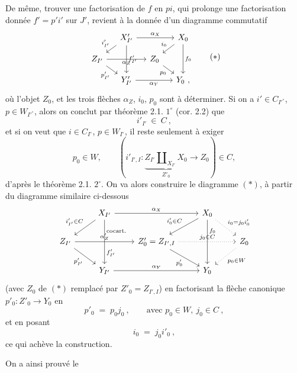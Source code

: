 \documentclass[11pt]{article}
\newcommand{\printedpage}[1]{\marginpar{\footnotesize p.~#1\ifstrequal{#1}{1}{\\[2pt]{[page 1]}}{}}}
\newcommand{\msp}[1]{\ifstrequal{#1}{page 1}{}{\marginpar{\footnotesize [#1]}}}
\begin{document}
De même, trouver une factorisation de $f$ en $pi$, qui prolonge une factorisation donnée $f'=p'i'$ sur $J'$, revient à la donnée d'un diagramme commutatif
\[
\begin{tikzcd}[column sep=small, row sep=small]
& X'_{I'} \arrow[rr, "\alpha_X"] \arrow[dl, "i'_{I'}"'] \arrow[dd, "f'_{I'}"] & & X_0 \arrow[dl, "i_0"'] \arrow[dd, "f_0"] \\
Z_{I'} \arrow[rr, "\alpha_Z"'] \arrow[dr, "p'_{I'}"'] & & Z_0 \arrow[dr, "p_0"'] & \\
& Y'_{I'} \arrow[rr, "\alpha_Y"'] & & Y_0\ ,
\end{tikzcd}
\tag*{$(*)$}
\]
\msp{48: blank}
\msp{49}
où l'objet $Z_0$, et les trois flèches $\alpha_Z$, $i_0$, $p_0$ sont à déterminer. Si on a $i'\in C_{I'^\circ}$, $p\in W_{I'^\circ}$, %
alors on conclut par théorème 2.1. $1^\circ$ (cor. 2.2) que
\[
i'_{I'}\ \in\ C\ ,
\]
et si on veut que $i\in C_{I^\circ}$, $p\in W_{I^\circ}$, il reste seulement à exiger
\[
p_0\in W, \qquad (i'_{I',I}:\underbrace{Z_{I'}\amalg_{X_{I'}}X_0}_{Z'_0}\longrightarrow Z_0)\in C,
\]
d'après le théorème 2.1. $2^\circ$. On va alors construire le diagramme $(*)$, à partir du diagramme similaire ci-dessous
\[
\begin{tikzcd}
& X_{I'} \arrow[rr, "\alpha_X"] \arrow[dl, "i'_{I'}\in C"'] \arrow[dd, "\text{cocart.}" {pos=0.25}, "f'_{I'}" {pos=0.75}] & & X_0 \arrow[dl, "i'_0\in C"'] \arrow[dd, "f_0" {pos=0.25}] \arrow[dr, dotted, "i_0=j_0i'_0"] & \\
Z_{I'} \arrow[rr, "\alpha'_Z"] \arrow[dr, "p'_{I'}"'] & & Z'_0=Z_{I',I} \arrow[rr, dotted, "j_0\in C"] \arrow[dr, "p'_0"'] & & Z_0 \arrow[dl, dotted, "p_0\in W"] \\
& Y_{I'} \arrow[rr, "\alpha_Y"] & & Y_0 &
\end{tikzcd}
\]
(avec $Z_0$ de $(*)$ remplacé par $Z'_0=Z_{I',I}$) en factorisant la flèche canonique $p'_0:Z'_0\longrightarrow Y_0$ en
\[
p'_0 \;=\; p_0j_0\ , \qquad \text{avec } p_0\in W,\ j_0\in C\ ,
\]
et en posant
\[
i_0 \;=\; j_0i'_0\ ,
\]
ce qui achève la construction.

On a ainsi prouvé le

\printedpage{26}
\end{document}
